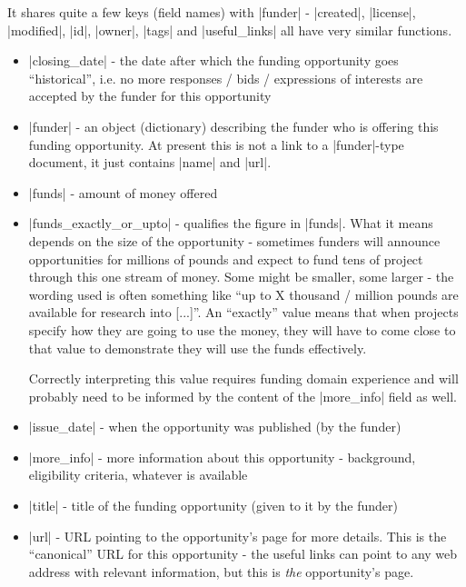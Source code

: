 \begin{itemize}
It shares quite a few keys (field names) with |funder| - |created|, |license|, |modified|, |id|, |owner|, |tags| and |useful_links| all have very similar functions.
	\begin{itemize}
	\item |closing_date| - the date after which the funding opportunity goes ``historical'', i.e. no more responses / bids / expressions of interests are accepted by the funder for this opportunity
	\item |funder| - an object (dictionary) describing the funder who is offering this funding opportunity. At present this is not a link to a |funder|-type document, it just contains |name| and |url|.
	\item |funds| - amount of money offered
	\item |funds_exactly_or_upto| - qualifies the figure in |funds|. What it means depends on the size of the opportunity - sometimes funders will announce opportunities for millions of pounds and expect to fund tens of project through this one stream of money. Some might be smaller, some larger - the wording used is often something like ``up to X thousand / million pounds are available for research into [...]''. An ``exactly'' value means that when projects specify how they are going to use the money, they will have to come close to that value to demonstrate they will use the funds effectively.
	
	Correctly interpreting this value requires funding domain experience and will probably need to be informed by the content of the |more_info| field as well.
	\item |issue_date| - when the opportunity was published (by the funder)

	\item |more_info| - more information about this opportunity - background, eligibility criteria, whatever is available
	\item |title| - title of the funding opportunity (given to it by the funder)
	\item |url| - URL pointing to the opportunity's page for more details. This is the ``canonical'' URL for this opportunity - the useful links can point to any web address with relevant information, but this is \emph{the} opportunity's page.
	\end{itemize}
\end{itemize}

